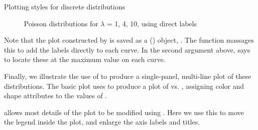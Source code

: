 \documentclass[11pt]{book}
\renewenvironment{knitrout}{\small\renewcommand{\baselinestretch}{.85}}{} %
\begin{document}
\begin{Example}{Plotting styles for discrete distributions}
\begin{knitrout}
\begin{figure}[!htbp]
\caption[Poisson distributions for $\lambda$ = 1, 4, 10, using direct labels]{Poisson distributions for $\lambda$ = 1, 4, 10, using direct labels\label{fig:dpois-xyplot2}}
\end{figure}


\end{knitrout}
Note that the plot constructed by  is saved as a
() object, .  The function
massages this to add the labels directly to each curve.  In the
second argument above,  says to locate these
at the maximum value on each curve.

Finally, we illustrate the use of  to produce a single-panel,
multi-line plot of these distributions. The basic plot uses
 to produce a plot of  vs. ,
assigning color and shape attributes to the values of .

\begin{knitrout}
\color{fgcolor}\begin{kframe}
\begin{alltt}
 \hlkwb{<-}  \hlstd{(}    \hlopt{+}
  \hlstd{(}\hlstd{=}\hlstd{)} \hlopt{+} \hlstd{(}\hlstd{=}\hlstd{)} \hlopt{+}
        \hlstd{(}\hlstd{)} \hlopt{+}
        \hlstd{(}\hlstd{)}
\end{alltt}
\end{kframe}
\end{knitrout}
 allows most details of the plot to be modified using
.  Here we use this to move the legend inside the plot,
and enlarge the axis labels and titles.
\begin{knitrout}
\color{fgcolor}\begin{kframe}
\begin{alltt}
 \hlopt{+} \hlstd{(}\hlstd{=}\hlstd{(}\hlstd{,}\hlstd{))} \hlopt{+}  
       \hlstd{(}\hlstd{=}\hlstd{(}\hlstd{=}\hlstd{),}
            \hlstd{=}\hlstd{(}\hlstd{=}\hlstd{,}\hlstd{=}\hlstd{))}
\end{alltt}
\end{kframe}\begin{figure}[!htbp]



\end{figure}
\end{knitrout}
\end{Example}
\end{document}

